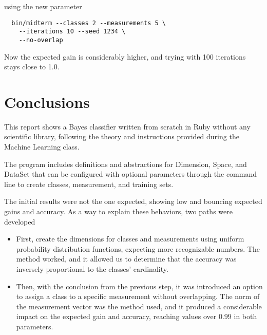 \documentclass[letterpaper, conference]{IEEEtran}
\begin{document}
using the new parameter

\begin{verbatim}
  bin/midterm --classes 2 --measurements 5 \
    --iterations 10 --seed 1234 \
    --no-overlap
\end{verbatim}

\begin{figure}[hbt]
  \label{fig:10-training-2-classes-no-overlapping}
  
  \caption{}
\end{figure}

Now the expected gain is considerably higher, and trying with 100 iterations stays close to 1.0.

\begin{figure}[hbt]
  \label{fig:100-training-2-classes-no-overlapping}
  
  \caption{}
\end{figure}

\section{Conclusions}

This report shows a Bayes classifier written from scratch in Ruby without any scientific library, following the theory and instructions provided during the Machine Learning class.

The program includes definitions and abstractions for Dimension, Space, and DataSet that can be configured with optional parameters through the command line to create classes, measurement, and training sets.

The initial results were not the one expected, showing low and bouncing expected gains and accuracy. As a way to explain these behaviors, two paths were developed

\begin{itemize}
  \item First, create the dimensions for classes and measurements using uniform probability distribution functions, expecting more recognizable numbers. The method worked, and it allowed us to determine that the accuracy was inversely proportional to the classes' cardinality.
  \item Then, with the conclusion from the previous step, it was introduced an option to assign a class to a specific measurement without overlapping. The norm of the measurement vector was the method used, and it produced a considerable impact on the expected gain and accuracy, reaching values over $0.99$ in both parameters.
\end{itemize}
\end{document}
